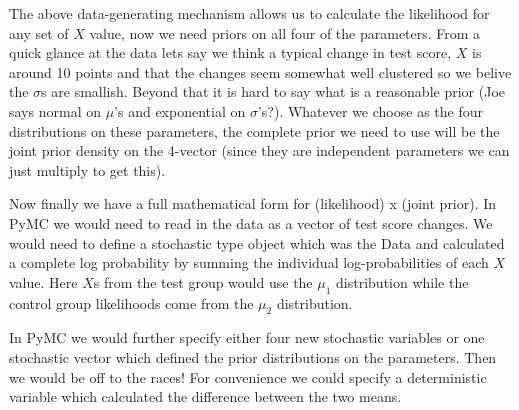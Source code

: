 The above data-generating mechanism allows us to calculate the likelihood for any set of $X$ value, now we need priors on all four of the parameters. From a quick glance at the data lets say we think a typical change in test score, $X$ is around 10 points and that the changes seem somewhat well clustered so we belive the $\sigma$s are smallish. Beyond that it is hard to say what is a reasonable prior (Joe says normal on $\mu$'s and exponential on $\sigma$'s?). Whatever we choose as the four distributions on these parameters, the complete prior we need to use will be the joint prior density on the 4-vector (since they are independent parameters we can just multiply to get this). 
\newline

Now finally we have a full mathematical form for (likelihood) x (joint prior). In PyMC we would need to read in the data as a vector of test score changes. We would need to define a stochastic type object which was the Data and calculated a complete log probability by summing the individual log-probabilities of each $X$ value. Here $X$s from the test group would use the $\mu_1$ distribution while the control group likelihoods come from the $\mu_2$ distribution.
\newline

In PyMC we would further specify either four new stochastic variables or one stochastic vector which defined the prior distributions on the parameters. Then we would be off to the races!  For convenience we could specify a deterministic variable which calculated the difference between the two means.



